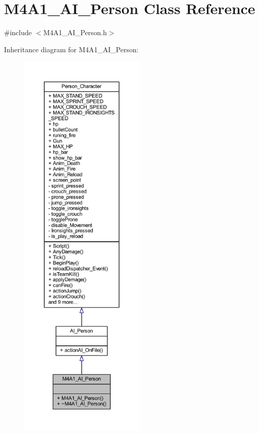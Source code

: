 \hypertarget{class_m4_a1___a_i___person}{}\section{M4\+A1\+\_\+\+A\+I\+\_\+\+Person Class Reference}
\label{class_m4_a1___a_i___person}


{\ttfamily \#include $<$M4\+A1\+\_\+\+A\+I\+\_\+\+Person.\+h$>$}



Inheritance diagram for M4\+A1\+\_\+\+A\+I\+\_\+\+Person\+:\nopagebreak
\begin{figure}[H]
\begin{center}
\leavevmode
\includegraphics[height=550pt]{class_m4_a1___a_i___person__inherit__graph}
\end{center}
\end{figure}


